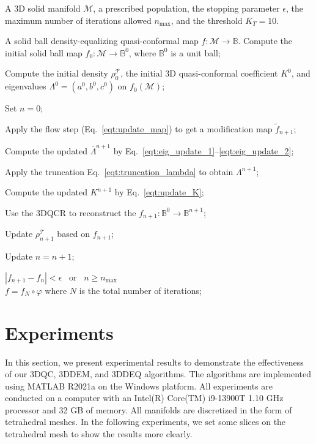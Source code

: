 \documentclass{article}
\begin{document}
\begin{algorithm}[h]
\caption{Bijective solid ball density-equalizing quasi-conformal map}
\label{alg:3DDEQ}
  \begin{algorithmic}[1]
    \Require A 3D solid manifold $\mathcal{M}$, a prescribed population, the stopping parameter $\epsilon$, the maximum number of iterations allowed $n_{\max}$, and the threshold $K_T = 10$.

    \Ensure A solid ball density-equalizing quasi-conformal map $f:\mathcal{M}\to \mathbb{B}$.
\State Compute the initial solid ball map $f_0: \mathcal{M} \rightarrow \mathbb{B}^0$, where $\mathbb{B}^0$ is a unit ball;

\State Compute the initial density $\rho_0^{\mathcal{T}}$, the initial 3D quasi-conformal coefficient $K^0$, and eigenvalues $\Lambda^0 = (a^0,b^0,c^0)$ on $f_0(\mathcal{M})$;

\State Set $n = 0$;

\Repeat

\State Apply the flow step (Eq.~\ref{eqt:update_map}) to get a modification map $\widetilde{f}_{n+1}$;

\State Compute the updated $\overline{\Lambda}^{n+1}$ by Eq.~\eqref{eqt:eig_update_1}--\eqref{eqt:eig_update_2};

\State Apply the truncation Eq.~\eqref{eqt:truncation_lambda} to obtain $\Lambda^{n+1}$;

\State Compute the updated $K^{n+1}$ by Eq.~\eqref{eqt:update_K};

\State Use the 3DQCR to reconstruct the $f_{n+1}:\mathbb{B}^0 \rightarrow \mathbb{B}^{n+1}$;

\State Update $\rho_{n+1}^{\mathcal{T}}$ based on $f_{n+1}$;

\State Update $n = n + 1$;

\Until $|f_{n+1} - f_n| < \epsilon$ \ or \ $n \geq n_{\max}$\\

\Return $f = f_N \circ \varphi$ where $N$ is the total number of iterations;

  \end{algorithmic}
\end{algorithm}




\section{Experiments}\label{sec:experiment}
In this section, we present experimental results to demonstrate the effectiveness of our 3DQC, 3DDEM, and 3DDEQ algorithms. The algorithms are implemented using MATLAB R2021a on the Windows platform. All experiments are conducted on a computer with an Intel(R) Core(TM) i9-13900T 1.10 GHz processor and 32 GB of memory. All manifolds are discretized in the form of tetrahedral meshes. In the following experiments, we set some slices on the tetrahedral mesh to show the results more clearly.
\end{document}
